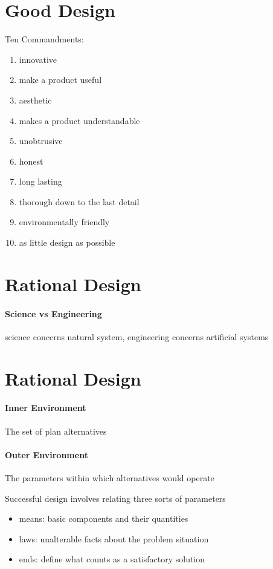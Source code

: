 \documentclass{article}
\begin{document}
\section*{Good Design}
\label{sec:good_design}

Ten Commandments:
\begin{enumerate}
	\item innovative
	\item make a product useful
	\item aesthetic
	\item makes a product understandable
	\item unobtrusive
	\item honest
	\item long lasting
	\item thorough down to the last detail
	\item environmentally friendly
	\item as little design as possible
\end{enumerate}

\section*{Rational Design}
\label{sec:rational_design}

\paragraph{Science vs Engineering}
\label{par:science_vs_engineering}
science concerns natural system, engineering concerns artificial systems

\section*{Rational Design}
\label{sec:rational_design}

\paragraph{Inner Environment}
\label{par:inner_environment}
The set of plan alternatives

\paragraph{Outer Environment}
\label{par:outer_environment}
The parameters within which alternatives would operate

Successful design involves relating three sorts of parameters
\begin{itemize}
	\item means: basic components and their quantities
	\item laws: unalterable facts about the problem situation
	\item ends: define what counts as a satisfactory solution
\end{itemize}
\end{document}

